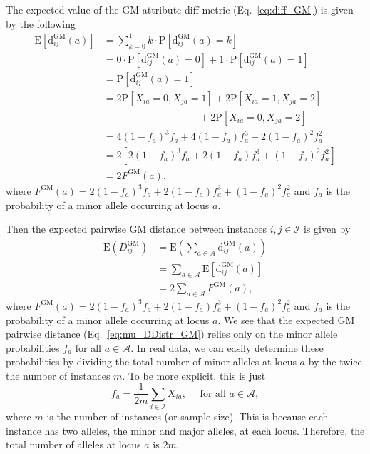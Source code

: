 \documentclass[aos]{imsart}
\begin{document}
The expected value of the GM attribute diff metric (Eq.~\ref{eq:diff_GM}) is given by the following
%
\begin{equation}\label{eq:mean_diff_GM}
\begin{aligned}
\text{E}\left[\text{d}^\text{GM}_{ij}(a)\right] &= \sum_{k=0}^{1} k \cdot \text{P}\left[\text{d}^\text{GM}_{ij}(a) = k\right] \\
&= 0 \cdot \text{P}\left[\text{d}^\text{GM}_{ij}(a) = 0\right] + 1 \cdot \text{P}\left[\text{d}^\text{GM}_{ij}(a) = 1\right] \\
&= \text{P}\left[\text{d}^\text{GM}_{ij}(a) = 1\right] \\
&= 2\text{P}[X_{ia} = 0, X_{ja} = 1] + 2\text{P}[X_{ia} = 1, X_{ja} = 2] \\
&\hspace{4cm}+ 2\text{P}[X_{ia} = 0, X_{ja} = 2] \\
&= 4(1 - f_a)^3f_a + 4(1 - f_a)f^3_a + 2(1 - f_a)^2f^2_a \\
&= 2\left[2(1 - f_a)^3f_a + 2(1 - f_a)f^3_a + (1 - f_a)^2f^2_a\right] \\
&= 2F^\text{GM}(a),
\end{aligned}
\end{equation}
%
where $F^\text{GM}(a) = 2(1 - f_a)^3f_a + 2(1 - f_a)f^3_a + (1 - f_a)^2f^2_a$ and $f_a$ is the probability of a minor allele occurring at locus $a$.

Then the expected pairwise GM distance between instances $i,j \in \mathcal{I}$ is given by
%
\begin{equation}\label{eq:mu_DDistr_GM}
\begin{aligned}
\text{E}\left(D^\text{GM}_{ij}\right) &= \text{E}\left(\sum_{a \in \mathcal{A}} \text{d}^\text{GM}_{ij}(a)\right) \\
&= \sum_{a \in \mathcal{A}} \text{E}\left[\text{d}^\text{GM}_{ij}(a)\right] \\
&= 2 \sum_{a \in \mathcal{A}} F^\text{GM}(a),
\end{aligned}
\end{equation}
%
where $F^\text{GM}(a) = 2(1 - f_a)^3f_a + 2(1 - f_a)f^3_a + (1 - f_a)^2f^2_a$ and $f_a$ is the probability of a minor allele occurring at locus $a$. We see that the expected GM pairwise distance (Eq.~\ref{eq:mu_DDistr_GM}) relies only on the minor allele probabilities $f_a$ for all $a \in \mathcal{A}$. In real data, we can easily determine these probabilities by dividing the total number of minor alleles at locus $a$ by the twice the number of instances $m$. To be more explicit, this is just
%
\[
f_a = \frac{1}{2m}\sum_{i \in \mathcal{I}} X_{ia},  \quad \text{ for all } a \in \mathcal{A},
\]
%
where $m$ is the number of instances (or sample size). This is because each instance has two alleles, the minor and major alleles, at each locus. Therefore, the total number of alleles at locus $a$ is $2m$.
\end{document}
